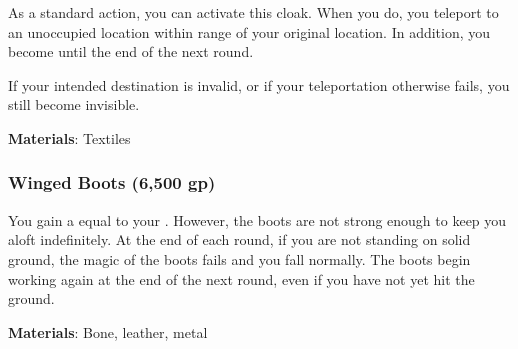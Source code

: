 As a standard action, you can activate this cloak.
When you do, you teleport to an unoccupied location within \rngmed range of your original location.
In addition, you become  until the end of the next round.

If your intended destination is invalid, or if your teleportation otherwise fails, you still become invisible.



\vspace{0.25em}
\textbf{Materials}: Textiles


\lowercase{\hypertarget{item:Winged Boots}{}}\label{item:Winged Boots}
\hypertarget{item:Winged Boots}{\subsubsection{Winged Boots\hfill{} (6,500 gp)}}

You gain a  equal to your .
However, the boots are not strong enough to keep you aloft indefinitely.
At the end of each round, if you are not standing on solid ground, the magic of the boots fails and you fall normally.
The boots begin working again at the end of the next round, even if you have not yet hit the ground.



\vspace{0.25em}
\textbf{Materials}: Bone, leather, metal
